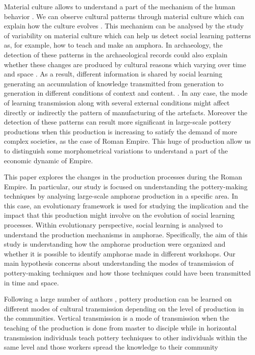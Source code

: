 \documentclass[review]{elsarticle}
\begin{document}
Material culture allows to understand a part of the mechanism of the human behavior \citep{richerson2005not, schillinger_copying_2016}. We can observe cultural patterns through material culture which can explain how the culture evolves \citep{richerson2005not}. This mechanism can be analysed by the study of variability on material culture which can help us detect social learning patterns as, for example, how to teach and make an amphora. In archaeology, the detection of these patterns in the archaeological records could also explain whether these changes are produced by cultural reasons which varying over time and space \citep{basalla1988evolution}. As a result, different information is shared by social learning generating an accumulation of knowledge transmitted from generation to generation in different conditions of context and content. \citep{eerkens_jelmer_cultural_2005, neff1992ceramics,henrich_evolution_2003, boyd_cultural_2011}. In any case, the mode of learning transmission along with several external conditions might affect directly or indirectly the pattern of manufacturing of the artefacts.
Moreover the detection of these patterns can result more significant in large-scale pottery productions when this production is increasing to satisfy the demand of more complex societies, as the case of Roman Empire. This huge of production allow us to distinguish some morphometrical variations to understand a part of the economic dynamic of Empire. 

This paper explores the changes in the production processes during the Roman Empire. In particular, our study is focused on understanding the pottery-making techniques by analysing large-scale amphorae production in a specific area. In this case, an evolutionary framework \citep{mesoudi_cultural_2015, shennan_evolution_2008} is used for studying the implication and the impact that this production might involve on the  evolution of social learning processes. Within evolutionary perspective, social learning is analysed to understand the production mechanisms in amphorae. Specifically, the aim of this study is understanding how the amphorae production were organized and whether it is possible to identify amphorae made in different workshops. Our main hypothesis concerns about understanding the modes of transmission of pottery-making techniques and how those techniques could have been transmitted in time and space. 

Following a large number of authors \citep{cavalli-sforza_cultural_1981, hosfield_modes_2009}, pottery production can be learned on different modes of cultural transmission depending on the level of production in the communities. Vertical transmission is a mode of transmission when the teaching of the production is done from master to disciple while in horizontal transmission individuals teach pottery techniques to other individuals within the same level and those workers spread the knowledge to their community \citep{epstein_craft_1998}
\end{document}
